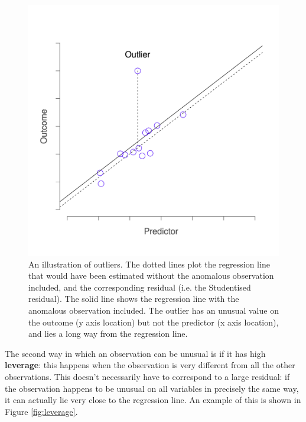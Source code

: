 \documentclass[
  11pt,
  a4paper,
  twoside,symmetric,openright]{book}
\theoremstyle{break}
\theoremstyle{break}
\begin{document}
\begin{figure}

{\centering \includegraphics[width=0.6\linewidth]{resources/image/unusual_outlier} 

}

\caption{An illustration of outliers. The dotted lines plot the regression line that would have been estimated without the anomalous observation included, and the corresponding residual (i.e. the Studentised residual). The solid line shows the regression line with the anomalous observation included. The outlier has an unusual value on the outcome (y axis location) but not the predictor (x axis location), and lies a long way from the regression line.}\label{fig:outlier}
\end{figure}

The second way in which an observation can be unusual is if it has high \textbf{leverage}: this happens when the observation is very different from all the other observations. This doesn't necessarily have to correspond to a large residual: if the observation happens to be unusual on all variables in precisely the same way, it can actually lie very close to the regression line. An example of this is shown in Figure \ref{fig:leverage}.
\end{document}
